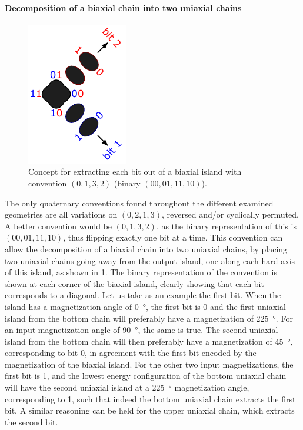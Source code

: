 \documentclass[11pt,a4paper,english,twoside]{article}
\begin{document}
\paragraph{Decomposition of a biaxial chain into two uniaxial chains}
\begin{figure}[t!]
    \centering
    \includegraphics[width=0.3\columnwidth]{Figures/Introduction/0132_biaxial_to_uniaxial.pdf}
    \caption{Concept for extracting each bit out of a biaxial island with convention $(0,1,3,2)$ (binary $(00,01,11,10)$).}
    \label{fig:halfadder_concept_0132_biaxial_to_uniaxial}
\end{figure}
The only quaternary conventions found throughout the different examined geometries are all variations on $(0,2,1,3)$, reversed and/or cyclically permuted.
A better convention would be $(0,1,3,2)$, as the binary representation of this is $(00, 01, 11, 10)$, thus flipping exactly one bit at a time. This convention can allow the decomposition of a biaxial chain into two uniaxial chains, by placing two uniaxial chains going away from the output island, one along each hard axis of this island, as shown in \cref{fig:halfadder_concept_0132_biaxial_to_uniaxial}. The binary representation of the convention is shown at each corner of the biaxial island, clearly showing that each bit corresponds to a diagonal. Let us take as an example the first bit. When the island has a magnetization angle of \SI{0}{\degree}, the first bit is 0 and the first uniaxial island from the bottom chain will preferably have a magnetization of \SI{225}{\degree}. For an input magnetization angle of \SI{90}{\degree}, the same is true. The second uniaxial island from the bottom chain will then preferably have a magnetization of \SI{45}{\degree}, corresponding to bit 0, in agreement with the first bit encoded by the magnetization of the biaxial island. For the other two input magnetizations, the first bit is 1, and the lowest energy configuration of the bottom uniaxial chain will have the second uniaxial island at a \SI{225}{\degree} magnetization angle, corresponding to 1, such that indeed the bottom uniaxial chain extracts the first bit. A similar reasoning can be held for the upper uniaxial chain, which extracts the second bit. \par
\end{document}
